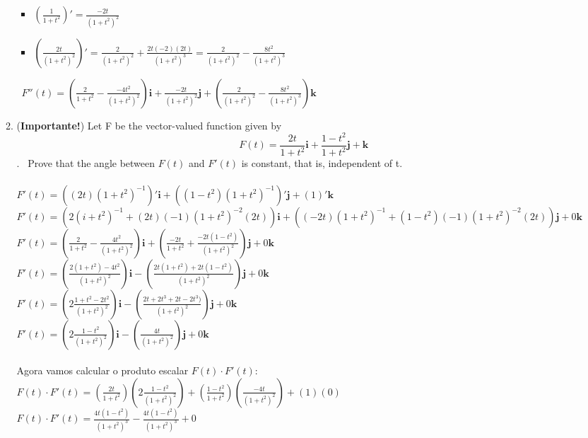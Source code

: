 \documentclass{article}
\begin{document}
\begin{enumerate}
\begin{enumerate}[label=1.\arabic*.]
\begin{itemize}
                    \item $(\frac{1}{1+t^2})' = \frac{-2t}{(1+t^2)^2}$ \
                    \item $(\frac{2t}{(1+t^2)^2})' = \frac{2}{(1+t^2)^2} + \frac{2t(-2)(2t)}{(1+t^2)^{3}} = \frac{2}{(1+t^2)^2} - \frac{8t^2}{(1+t^2)^3}$ \
                \end{itemize} \
                $F''(t) = (\frac{2}{1+t^2} - \frac{-4t^2}{(1+t^2)^2})\textbf{i} + \frac{-2t}{(1+t^2)^2} \textbf{j} + (\frac{2}{(1+t^2)^2} - \frac{8t^2}{(1+t^2)^3}) \textbf{k}$ \\
            \item (\textbf{Importante!}) Let F be the vector-valued function given by \\
                $$F(t) = \frac{2t}{1+t^2}\textbf{i} + \frac{1-t^2}{1+t^2}\textbf{j} + \textbf{k}$$. \
                Prove that the angle between $F(t)$ and $F'(t)$ is constant, that is, independent of t. \\
                \\
                $F'(t)=((2t)(1+t^2)^{-1})' \textbf{i} + ((1-t^2)(1+t^2)^{-1})' \textbf{j} + (1)' \textbf{k}$ \\
                $F'(t)=(2(i+t^2)^{-1} + (2t)(-1)(1+t^2)^{-2}(2t)) \textbf{i} + ((-2t)(1+t^2)^{-1} + (1-t^2)(-1)(1+t^2)^{-2}(2t)) \textbf{j} + 0 \textbf{k}$ \\
                $F'(t)=(\frac{2}{1+t^2} - \frac{4t^2}{(1+t^2)^2}) \textbf{i} + (\frac{-2t}{1+t^2} + \frac{-2t(1-t^2)}{(1+t^2)^2}) \textbf{j} + 0 \textbf{k}$ \\
                $F'(t)=(\frac{2(1+t^2) - 4t^2}{(1+t^2)^2}) \textbf{i} - (\frac{2t(1+t^2) + 2t(1-t^2)}{(1+t^2)^2}) \textbf{j} + 0 \textbf{k}$ \\
                $F'(t)=(2\frac{1+t^2 - 2t^2}{(1+t^2)^2}) \textbf{i} - (\frac{2t+2t^3 + 2t-2t^3)}{(1+t^2)^2}) \textbf{j} + 0 \textbf{k}$ \\
                $F'(t)=(2\frac{1-t^2}{(1+t^2)^2}) \textbf{i} - (\frac{4t}{(1+t^2)^2}) \textbf{j} + 0 \textbf{k}$ \\
                \\
                Agora vamos calcular o produto escalar $F(t) \cdot F'(t)$: \\
                $F(t) \cdot F'(t) = (\frac{2t}{1+t^2})(2\frac{1-t^2}{(1+t^2)^2}) + (\frac{1-t^2}{1+t^2})(\frac{-4t}{(1+t^2)^2}) + (1)(0)$ \\
                $F(t) \cdot F'(t) = \frac{4t(1-t^2)}{(1+t^2)^3} - \frac{4t(1-t^2)}{(1+t^2)^3} + 0$ \\

\end{enumerate}
\end{enumerate}
\end{document}
